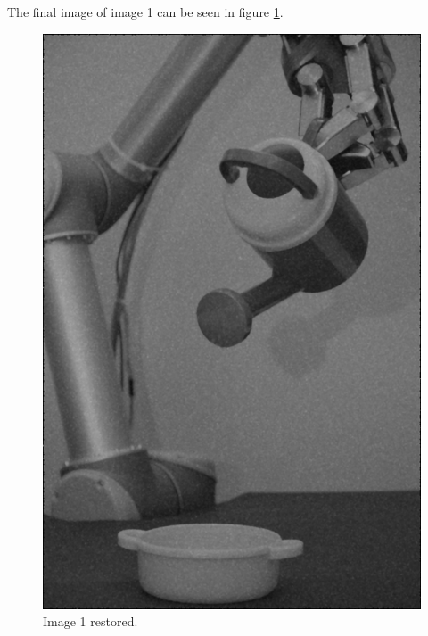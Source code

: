 The final image of image 1 can be seen in figure \ref{fig:final_image1}.

\begin{figure}[H]
\centering
\includegraphics[width = \fullImageWidth]{../code/images/image_result_1.png}
\caption{Image 1 restored.}
\label{fig:final_image1}
\end{figure}
